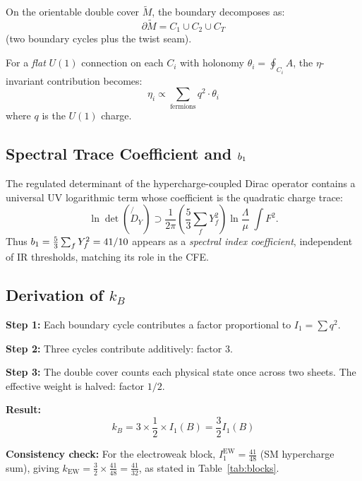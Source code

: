 On the orientable double cover $\widetilde{M}$, the boundary decomposes as:
\begin{equation}
    \partial\widetilde{M} = C_1 \cup C_2 \cup C_T
\end{equation}
(two boundary cycles plus the twist seam).

For a \emph{flat} $U(1)$ connection on each $C_i$ with holonomy $\theta_i = \oint_{C_i} A$, 
the $\eta$-invariant contribution becomes:
\begin{equation}
    \eta_i \propto \sum_{\text{fermions}} q^2 \cdot \theta_i
\end{equation}
where $q$ is the $U(1)$ charge.

\subsection{Spectral Trace Coefficient and $b_1$}
The regulated determinant of the hypercharge-coupled Dirac operator contains a universal
UV logarithmic term whose coefficient is the quadratic charge trace:
\begin{equation}
    \ln\det(\not{D}_Y) \supset \frac{1}{2\pi}\left(\frac{5}{3}\sum_f Y_f^2\right)
    \ln\frac{\Lambda}{\mu}\;\int F^2.
\end{equation}
Thus $b_1 = \frac{5}{3}\sum_f Y_f^2 = 41/10$ appears as a \emph{spectral index coefficient},
independent of IR thresholds, matching its role in the CFE.

\subsection{Derivation of $k_B$}

\textbf{Step 1:} Each boundary cycle contributes a factor proportional to $I_1 = \sum q^2$.

\textbf{Step 2:} Three cycles contribute additively: factor 3.

\textbf{Step 3:} The double cover counts each physical state once across two sheets. 
The effective weight is halved: factor $1/2$.

\textbf{Result:}
\begin{equation}
    k_B = 3 \times \frac{1}{2} \times I_1(B) = \frac{3}{2} I_1(B)
\end{equation}

\textbf{Consistency check:} For the electroweak block, 
$I_1^{\text{EW}} = \frac{41}{48}$ (SM hypercharge sum), giving 
$k_{\text{EW}} = \frac{3}{2} \times \frac{41}{48} = \frac{41}{32}$, 
as stated in Table~\ref{tab:blocks}.

